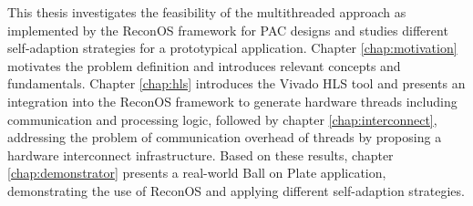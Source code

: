 This thesis investigates the feasibility of the multithreaded approach as
implemented by the ReconOS framework for \ac{PAC} designs and studies
different self-adaption strategies for a prototypical application. Chapter
\ref{chap:motivation} motivates the problem definition and introduces relevant
concepts and fundamentals. Chapter \ref{chap:hls} introduces the Vivado HLS
tool and presents an integration into the ReconOS framework to generate
hardware threads including communication and processing logic, followed by
chapter \ref{chap:interconnect}, addressing the problem of communication
overhead of threads by proposing a hardware interconnect infrastructure. Based
on these results, chapter \ref{chap:demonstrator} presents a real-world Ball
on Plate application, demonstrating the use of ReconOS and applying different
self-adaption strategies.